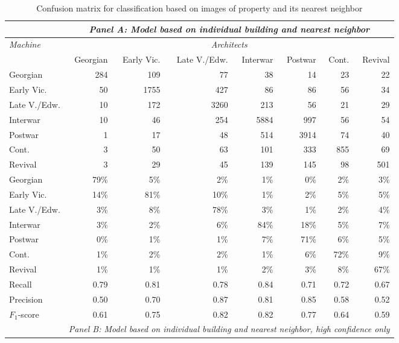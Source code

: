 \begin{table}[!htb]
	\caption{Confusion matrix for classification based on images of property and its nearest neighbor}
	\label{tab:confmat}
	\centering
\begingroup\footnotesize
	\emph{}
\begin{tabular}{lrrrrrrr}
	& \multicolumn{7}{c}{\rule{0pt}{4ex}    \emph{Panel A: Model based on individual building and nearest neighbor} \rule{0pt}{4ex}    }\\
	\toprule
	\emph{Machine} & \multicolumn{7}{c}{\emph{Architects}} \\
	\cmidrule(lr){2-8}
	& Georgian & Early Vic. & Late V./Edw. & Interwar & Postwar & Cont. & Revival \\
  \cmidrule(lr){1-1}
\cmidrule(lr){2-8}
	Georgian & 284 & 109 & 77 & 38 & 14 & 23 & 22 \\
	  Early Vic. & 50 & 1755 & 427 & 86 & 86 & 56 & 34 \\
	  Late V./Edw. & 10 & 172 & 3260 & 213 & 56 & 21 & 29 \\
	  Interwar & 10 & 46 & 254 & 5884 & 997 & 56 & 54 \\
	  Postwar & 1 & 17 & 48 & 514 & 3914 & 74 & 40 \\
	  Cont. & 3 & 50 & 63 & 101 & 333 & 855 & 69 \\
	  Revival & 3 & 29 & 45 & 139 & 145 & 98 & 501 \\
		\cmidrule(lr){1-1}
\cmidrule(lr){2-8}
	  Georgian & 79\% & 5\% & 2\% & 1\% & 0\% & 2\% & 3\% \\
	  Early Vic. & 14\% & 81\% & 10\% & 1\% & 2\% & 5\% & 5\% \\
	  Late V./Edw. & 3\% & 8\% & 78\% & 3\% & 1\% & 2\% & 4\% \\
	  Interwar & 3\% & 2\% & 6\% & 84\% & 18\% & 5\% & 7\% \\
	  Postwar & 0\% & 1\% & 1\% & 7\% & 71\% & 6\% & 5\% \\
	  Cont. & 1\% & 2\% & 2\% & 1\% & 6\% & 72\% & 9\% \\
	  Revival & 1\% & 1\% & 1\% & 2\% & 3\% & 8\% & 67\% \\
		\cmidrule(lr){1-1}
\cmidrule(lr){2-8}
	  Recall & 0.79 & 0.81 & 0.78 & 0.84 & 0.71 & 0.72 & 0.67 \\
	  Precision & 0.50 & 0.70 & 0.87 & 0.81 & 0.85 & 0.58 & 0.52 \\
	  $F_1$-score & 0.61 & 0.75 & 0.82 & 0.82 & 0.77 & 0.64 & 0.59 \\

		\cmidrule(lr){1-1} \cmidrule(lr){2-8}
		& \multicolumn{7}{c}{ \emph{ Panel B: Model based on individual building and nearest neighbor, high confidence only} \rule{0pt}{4ex}    }\\
		\cmidrule(lr){1-1} \cmidrule(lr){2-8}


\end{tabular}
\end{table}
